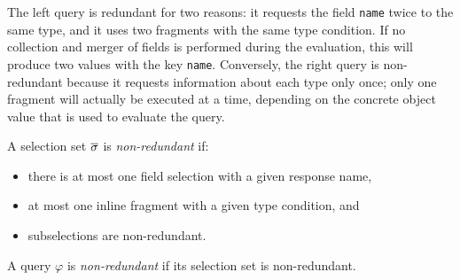 \bigskip

The left query is redundant for two reasons: it requests the field \texttt{name} twice to the same type, and it uses two fragments with the same type condition. If no collection and merger of fields is performed during the evaluation, this will produce two values with the key \texttt{name}. 
Conversely, the right query is non-redundant because it requests information about each type only once; only one fragment will actually be executed at a time, depending on the concrete object value that is used to evaluate the query.

\begin{definition}
A \gql selection set $\overline{\sigma}$ is \textit{non-redundant} if:
\begin{itemize}
    \item there is at most one field selection with a given response name, 
    
    \item at most one inline fragment with a given type condition, and
    
    \item subselections are non-redundant.
\end{itemize}
\end{definition}

\begin{definition}
A \gql query $\varphi$ is \textit{non-redundant} if its selection set is non-redundant.
\end{definition}



